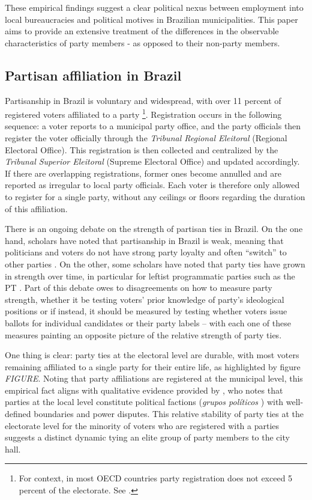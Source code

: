 \documentclass[12pt,a4paper]{article}
\begin{document}
These empirical findings suggest a clear political nexus between employment into local bureaucracies and political motives in Brazilian municipalities. This paper aims to provide an extensive treatment of the differences in the observable characteristics of party members - as opposed to their non-party members.

\subsection{Partisan affiliation in Brazil}

Partisanship in Brazil is voluntary and widespread, with over 11 percent of registered voters affiliated to a party \citep{speck2015estudo}\footnote{For context, in most OECD countries party registration does not exceed 5 percent of the electorate. See \citet{biezen2014decline}.}. Registration occurs in the following sequence: a voter reports to a municipal party office, and the party officials then register the voter officially through the \emph{Tribunal Regional Eleitoral} (Regional Electoral Office). This registration is then collected and centralized by the \emph{Tribunal Superior Eleitoral} (Supreme Electoral Office) and updated accordingly. If there are overlapping registrations, former ones become annulled and are reported as irregular to local party officials. Each voter is therefore only allowed to register for a single party, without any ceilings or floors regarding the duration of this affiliation.

There is an ongoing debate on the strength of partisan ties in Brazil. On the one hand, scholars have noted that partisanship in Brazil is weak, meaning that politicians and voters do not have strong party loyalty and often ``switch'' to other parties \citep{desposato2006parties,ames2002deadlock}. On the other, some scholars have noted that party ties have grown in strength over time, in particular for leftist programmatic parties such as the PT \citep{samuels2014power,samuels2006sources}. Part of this debate owes to disagreements on how to measure party strength, whether it be testing voters' prior knowledge of party's ideological positions or if instead, it should be measured by testing whether voters issue ballots for individual candidates or their party labels -- with each one of these measures painting an opposite picture of the relative strength of party ties.

One thing is clear: party ties at the electoral level are durable, with most voters remaining affiliated to a single party for their entire life, as highlighted by figure \emph{FIGURE}. Noting that party affiliations are registered at the municipal level, this empirical fact aligns with qualitative evidence provided by \citet{palmeira1995comicios}, who notes that parties at the local level constitute political factions (\emph{grupos pol\'{i}ticos} ) with well-defined boundaries and power disputes. This relative stability of party ties at the electorate level for the minority of voters who are registered with a parties suggests a distinct dynamic tying an elite group of party members to the city hall.
\end{document}
